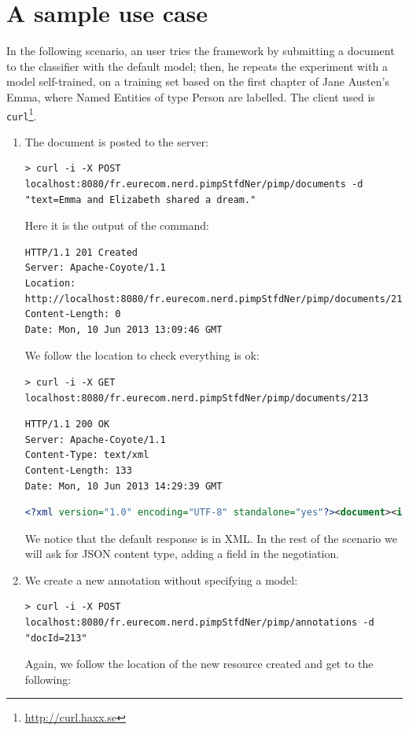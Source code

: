 \documentclass[a4paper,11pt]{report}
\begin{document}
\section{A sample use case}
In the following scenario, an user tries the framework by submitting a document to the classifier with the default model; then, he repeats the experiment with a model self-trained, on a training set based on the first chapter of Jane Austen's Emma, where Named Entities of type Person are labelled.
The client used is \texttt{curl}\footnote{\url{http://curl.haxx.se}}.
\begin{enumerate}
\item The document is posted to the server:
\begin{lstlisting}
> curl -i -X POST localhost:8080/fr.eurecom.nerd.pimpStfdNer/pimp/documents -d "text=Emma and Elizabeth shared a dream."
\end{lstlisting}
Here it is the output of the command:
\begin{lstlisting}
HTTP/1.1 201 Created
Server: Apache-Coyote/1.1
Location: http://localhost:8080/fr.eurecom.nerd.pimpStfdNer/pimp/documents/213
Content-Length: 0
Date: Mon, 10 Jun 2013 13:09:46 GMT
\end{lstlisting}
We follow the location to check everything is ok:
\begin{lstlisting}
> curl -i -X GET localhost:8080/fr.eurecom.nerd.pimpStfdNer/pimp/documents/213
\end{lstlisting}
\begin{lstlisting}
HTTP/1.1 200 OK
Server: Apache-Coyote/1.1
Content-Type: text/xml
Content-Length: 133
Date: Mon, 10 Jun 2013 14:29:39 GMT
\end{lstlisting}
\noindent
\begin{lstlisting}[language=XML]
<?xml version="1.0" encoding="UTF-8" standalone="yes"?><document><id>213</id><text>Emma and Elizabeth shared a dream.</text></document>
\end{lstlisting}
We notice that the default response is in XML. In the rest of the scenario we will ask for JSON content type, adding a field in the negotiation.
\item We create a new annotation without specifying a model:
\begin{lstlisting}
> curl -i -X POST localhost:8080/fr.eurecom.nerd.pimpStfdNer/pimp/annotations -d "docId=213"
\end{lstlisting}
Again, we follow the location of the new resource created and get to the following:

\end{enumerate}
\end{document}
